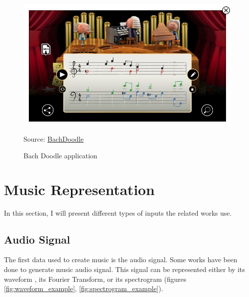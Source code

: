 \documentclass[12pt]{report}
\begin{document}
\begin{figure}[htbp]
    \centering
    \includegraphics[width=\textwidth]{images/related_works/bachdooldle/bachdoodle.jpg}
    \caption{Bach Doodle application}
    Source: \href{https://www.google.com/doodles/celebrating-johann-sebastian-bach}{BachDoodle}
    \label{fig:bachdoodle}
\end{figure}


\section{Music Representation}
\label{sec:related-works:music-representation}

In this section, I will present different types of inputs the related works use.

\subsection{Audio Signal} 

The first data used to create music is the audio signal. Some works \cite{oord_wavenet:_2016, dieleman_challenge_2018, donahue_adversarial_2019, kalchbrenner_efficient_2018, mehri_samplernn_2017, lu_play_2018} have been done to generate music audio signal.
This signal can be represented either by its waveform \cite{oord_wavenet:_2016}, its Fourier Transform, or its spectrogram (figures \ref{fig:waveform_example}, \ref{fig:spectrogram_example}).
\end{document}
